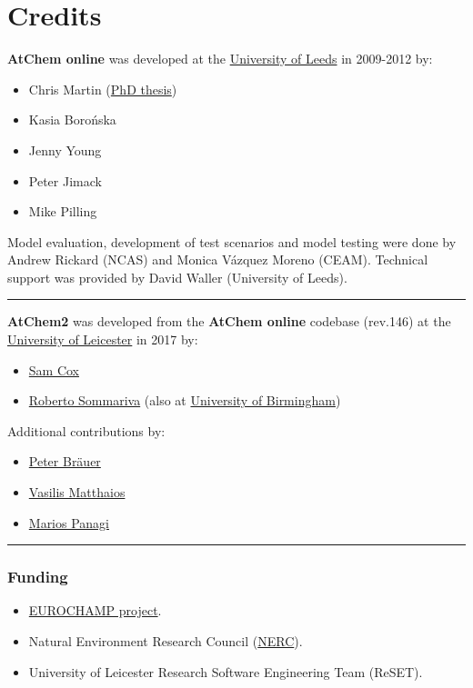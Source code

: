 \chapter{Credits}

\textbf{AtChem online} was developed at the
\href{https://www.leeds.ac.uk}{University of Leeds} in 2009-2012 by:

\begin{itemize}
\tightlist
\item
  Chris Martin (\href{http://etheses.whiterose.ac.uk/1596/}{PhD thesis})
\item
  Kasia Borońska
\item
  Jenny Young
\item
  Peter Jimack
\item
  Mike Pilling
\end{itemize}

Model evaluation, development of test scenarios and model testing were
done by Andrew Rickard (NCAS) and Monica Vázquez Moreno (CEAM).
Technical support was provided by David Waller (University of Leeds).

\begin{center}\rule{0.5\linewidth}{\linethickness}\end{center}

\textbf{AtChem2} was developed from the \textbf{AtChem online} codebase
(rev.146) at the \href{https://le.ac.uk}{University of Leicester} in
2017 by:

\begin{itemize}
\tightlist
\item
  \href{https://github.com/spco}{Sam Cox}
\item
  \href{https://github.com/rs028}{Roberto Sommariva} (also at
  \href{https://www.birmingham.ac.uk}{University of Birmingham})
\end{itemize}

Additional contributions by:

\begin{itemize}
\tightlist
\item
  \href{https://github.com/pb866}{Peter Bräuer}
\item
  \href{https://github.com/kailas29}{Vasilis Matthaios}
\item
  \href{https://github.com/mpanagi}{Marios Panagi}
\end{itemize}

\begin{center}\rule{0.5\linewidth}{\linethickness}\end{center}

\hypertarget{funding}{%
\subsection{Funding}\label{funding}}

\begin{itemize}
\tightlist
\item
  \href{https://www.eurochamp.org/}{EUROCHAMP project}.
\item
  Natural Environment Research Council
  (\href{https://www.nerc.ac.uk/}{NERC}).
\item
  University of Leicester Research Software Engineering Team (ReSET).
\end{itemize}
